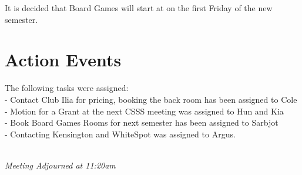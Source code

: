 \documentclass[12pt]{article}
\begin{document}
\noindent It is decided that Board Games will start at on the first Friday of the new semester. \\ 
\section{Action Events}\label{sec:Action}
The following tasks were assigned: \\
- Contact Club Ilia for pricing, booking the back room has been assigned to Cole \\
- Motion for a Grant at the next CSSS meeting was assigned to Hun and Kia \\
- Book Board Games Rooms for next semester has been assigned to Sarbjot \\
- Contacting Kensington and WhiteSpot was assigned to Argus.  \\ \\

\begin{center}
\em{Meeting Adjourned at 11:20am}
\end{center}
\end{document}
